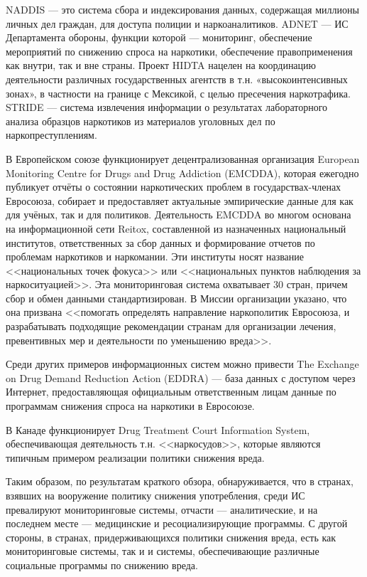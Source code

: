 NADDIS — это система сбора и индексирования данных, содержащая миллионы личных 
дел граждан, для доступа полиции и наркоаналитиков. ADNET — ИС Департамента 
обороны, функции которой — мониторинг, обеспечение мероприятий по снижению 
спроса на наркотики, обеспечение правоприменения как внутри, так и вне страны. 
Проект HIDTA нацелен на координацию деятельности различных государственных 
агентств в т.н. «высокоинтенсивных зонах», в частности на границе с Мексикой, с 
целью пресечения наркотрафика. STRIDE — система извлечения информации о
результатах лабораторного анализа образцов наркотиков из материалов уголовных 
дел по наркопреступлениям.

В Европейском союзе функционирует децентрализованная организация European 
Monitoring Centre for Drugs and Drug Addiction (EMCDDA), которая ежегодно 
публикует отчёты о состоянии наркотических проблем в государствах-членах 
Евросоюза, собирает и предоставляет актуальные эмпирические данные для как для 
учёных, так и для политиков. Деятельность EMCDDA во многом основана на 
информационной сети Reitox, составленной из назначенных национальный институтов, 
ответственных за сбор данных и формирование отчетов по проблемам наркотиков и 
наркомании.  Эти институты носят название <<национальных точек фокуса>> или 
<<национальных пунктов наблюдения за наркоситуацией>>. Эта мониторинговая 
система охватывает 30 стран, причем сбор и обмен данными стандартизирован. В 
Миссии организации указано, что она призвана <<помогать определять направление 
наркополитик Евросоюза, и разрабатывать подходящие рекомендации странам для 
организации лечения, превентивных мер и деятельности по уменьшению вреда>>.

Среди других примеров информационных систем можно привести The Exchange on Drug 
Demand Reduction Action (EDDRA) --- база данных с доступом через Интернет, 
предоставляющая официальным ответственным лицам данные по программам снижения 
спроса на наркотики в Евросоюзе.

В Канаде функционирует Drug Treatment Court Information System, обеспечивающая 
деятельность т.н. <<наркосудов>>, которые являются типичным примером реализации 
политики снижения вреда.

Таким образом, по результатам краткого обзора, обнаруживается, что в странах, 
взявших на вооружение политику снижения употребления, среди ИС превалируют 
мониторинговые системы, отчасти --- аналитические, и на последнем месте --- 
медицинские и ресоциализирующие программы.
С другой стороны, в странах, придерживающихся политики снижения вреда, есть как 
мониторинговые системы, так и и системы, обеспечивающие различные социальные 
программы по снижению вреда.

